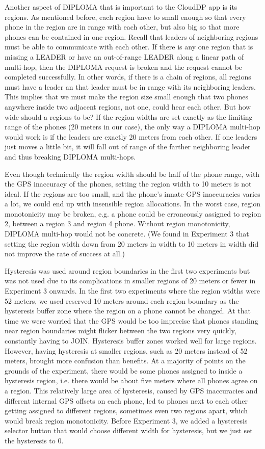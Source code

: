 Another aspect of DIPLOMA that is important to the CloudDP app is its regions. As mentioned before, each region have to small enough so that every phone in the region are in range with each other, but also big so that more phones can be contained in one region. Recall that leaders of neighboring regions must be able to communicate with each other. If there is any one region that is missing a LEADER or have an out-of-range LEADER along a linear path of multi-hop, then the DIPLOMA request is broken and the request cannot be completed successfully. In other words, if there is a chain of regions, all regions must have a leader an that leader must be in range with its neighboring leaders. This implies that we must make the region size small enough that two phones anywhere inside two adjacent regions, not one, could hear each other.  But how wide should a regions to be? If the region widths are set exactly as the limiting range of the phones (20 meters in our case), the only way a DIPLOMA multi-hop would work is if the leaders are exactly 20 meters from each other. If one leaders just moves a little bit, it will fall out of range of the farther neighboring leader and thus breaking DIPLOMA multi-hops.

Even though technically the region width should be half of the phone range, with the GPS inaccuracy of the phones, setting the region width to 10 meters is not ideal. If the regions are too small, and the phone's innate GPS inaccuracies varies a lot, we could end up with insensible region allocations. In the worst case, region monotonicity may be broken, e.g. a phone could be erroneously assigned to region 2, between a region 3 and region 4 phone. Without region monotonicity, DIPLOMA multi-hop would not be concrete. (We found in Experiment 3 that setting the region width down from 20 meters in width to 10 meters in width did not improve the rate of success at all.)

Hysteresis was used around region boundaries in the first two experiments but was not used due to its complications in smaller regions of 20 meters or fewer in Experiment 3 onwards. In the first two experiments where the region widths were 52 meters, we used reserved 10 meters around each region boundary as the hysteresis buffer zone where the region on a phone cannot be changed. At that time we were worried that the GPS would be too imprecise that phones standing near region boundaries might flicker between the two regions very quickly, constantly having to JOIN. Hysteresis buffer zones worked well for large regions. However, having hysteresis at smaller regions, such as 20 meters instead of 52 meters, brought more confusion than benefits. At a majority of points on the grounds of the experiment, there would be some phones assigned to inside a hysteresis region, i.e. there would be about five meters where all phones agree on a region. This relatively large area of hysteresis, caused by GPS inaccuracies and different internal GPS offsets on each phone, led to phones next to each other getting assigned to different regions, sometimes even two regions apart, which would break region monotonicity. Before Experiment 3, we added a hysteresis selector button that would choose different width for hysteresis, but we just set the hysteresis to 0.